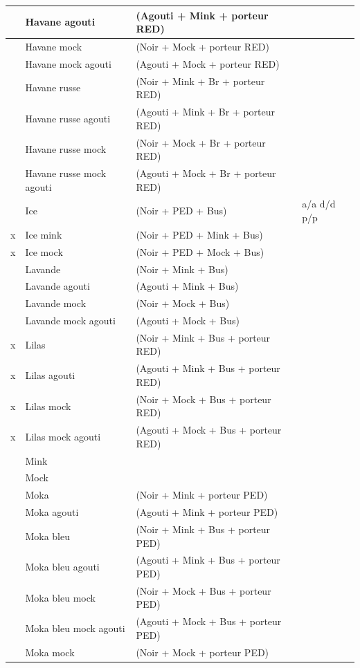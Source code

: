 \documentclass[a4paper,10pt]{article}
\begin{document}
\begin{longtable}{|c|l|l|l|}
& Havane agouti  & (Agouti + Mink + porteur   RED) & \\\hline
& Havane mock  & (Noir + Mock + porteur RED) & \\\hline
& Havane mock agouti  & (Agouti + Mock + porteur RED) & \\\hline
& Havane russe  & (Noir + Mink + Br + porteur RED) & \\\hline
& Havane russe agouti  & (Agouti + Mink + Br + porteur RED) & \\\hline
& Havane russe mock  & (Noir + Mock + Br + porteur RED) & \\\hline
& Havane russe mock agouti  & (Agouti + Mock + Br + porteur RED) & \\\hline
& Ice  & (Noir + PED + Bus) & a/a d/d p/p\\\hline
x & Ice mink  & (Noir + PED + Mink + Bus) & \\\hline
x & Ice mock  & (Noir + PED + Mock + Bus) & \\\hline
& Lavande  & (Noir + Mink + Bus) & \\\hline
& Lavande agouti & (Agouti + Mink + Bus) & \\\hline
& Lavande mock  & (Noir + Mock + Bus) & \\\hline
& Lavande mock agouti  & (Agouti + Mock + Bus) & \\\hline
x & Lilas  & (Noir + Mink + Bus + porteur RED) & \\\hline
x & Lilas agouti  & (Agouti + Mink + Bus +   porteur RED) & \\\hline
x & Lilas mock  & (Noir + Mock + Bus + porteur RED) & \\\hline
x & Lilas mock agouti  & (Agouti + Mock + Bus + porteur RED) & \\\hline
& Mink & & \\\hline
& Mock & & \\\hline
& Moka  & (Noir + Mink + porteur PED) & \\\hline
& Moka agouti  & (Agouti + Mink + porteur PED) & \\\hline
& Moka bleu  & (Noir + Mink + Bus + porteur PED) & \\\hline
& Moka bleu agouti  & (Agouti + Mink + Bus + porteur PED) & \\\hline
& Moka bleu mock  & (Noir + Mock + Bus + porteur PED) & \\\hline
& Moka bleu mock agouti  & (Agouti + Mock +   Bus + porteur PED) & \\\hline
& Moka mock  & (Noir + Mock + porteur PED) & \\\hline

\end{longtable}
\end{document}
